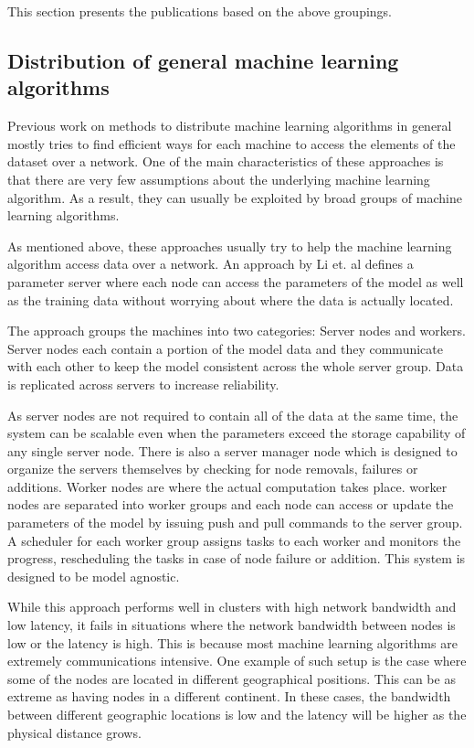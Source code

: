 \documentclass[11pt]{article}       %
\begin{document}
This section presents the publications based on the above groupings.

\subsection{Distribution of general machine learning algorithms}

Previous work on methods to distribute machine learning algorithms in general mostly tries to find efficient ways for each machine to access the elements of the dataset over a network. One of the main characteristics of these approaches is that there are very few assumptions about the underlying machine learning algorithm. As a result, they can usually be exploited by broad groups of machine learning algorithms.

As mentioned above, these approaches usually try to help the machine learning algorithm access data over a network. An approach by Li et. al\cite{Li2014} defines a parameter server where each node can access the parameters of the model as well as the training data without worrying about where the data is actually located. 

The approach groups the machines into two categories: Server nodes and workers. Server nodes each contain a portion of the model data and they communicate with each other to keep the model consistent across the whole server group. Data is replicated across servers to increase reliability. 

As server nodes are not required to contain all of the data at the same time, the system can be scalable even when the parameters exceed the storage capability of any single server node. There is also a server manager node which is designed to organize the servers themselves by checking for node removals, failures or additions.
Worker nodes are where the actual computation takes place. worker nodes are separated into worker groups and each node can access or update the parameters of the model by issuing push and pull commands to the server group. A scheduler for each worker group assigns tasks to each worker and monitors the progress, rescheduling the tasks in case of node failure or addition. This system is designed to be model agnostic.

While this approach performs well in clusters with high network bandwidth and low latency, it fails in situations where the network bandwidth between nodes is low or the latency is high. This is because most machine learning algorithms are extremely communications intensive. One example of such setup is the case where some of the nodes are located in different geographical positions. This can be as extreme as having nodes in a different continent. In these cases, the bandwidth between different geographic locations is low and the latency will be higher as the physical distance grows. 
\end{document}

